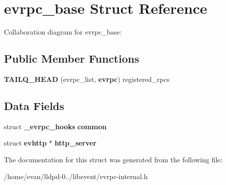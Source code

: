 \section{evrpc\-\_\-base \-Struct \-Reference}
\label{structevrpc__base}


\-Collaboration diagram for evrpc\-\_\-base\-:
\subsection*{\-Public \-Member \-Functions}
\begin{DoxyCompactItemize}
\item 
{\bfseries \-T\-A\-I\-L\-Q\-\_\-\-H\-E\-A\-D} (evrpc\-\_\-list, {\bf evrpc}) registered\-\_\-rpcs\label{structevrpc__base_a34e65059e9f0ec843dcff658f9ccc9b1}

\end{DoxyCompactItemize}
\subsection*{\-Data \-Fields}
\begin{DoxyCompactItemize}
\item 
struct {\bf \-\_\-evrpc\-\_\-hooks} {\bfseries common}\label{structevrpc__base_a8f090a8ffe0506f6544e22517e94b6cb}

\item 
struct {\bf evhttp} $\ast$ {\bfseries http\-\_\-server}\label{structevrpc__base_a74bda8098cf18dc3269a397b2acb0a2e}

\end{DoxyCompactItemize}


\-The documentation for this struct was generated from the following file\-:\begin{DoxyCompactItemize}
\item 
/home/evan/lldpd-\/0../libevent/evrpc-\/internal.\-h\end{DoxyCompactItemize}
